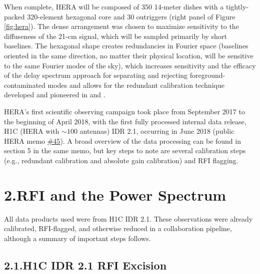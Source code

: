 \documentclass[12pt]{article}
\begin{document}
When complete, HERA will be composed of 350 14-meter dishes with a tightly-packed 320-element hexagonal core and 30 outriggers (right panel of Figure \ref{fig:hera}). The dense arrangement was chosen to maximize sensitivity to the diffuseness of the 21-cm signal, which will be sampled primarily by short baselines. The hexagonal shape creates redundancies in Fourier space (baselines oriented in the same direction, no matter their physical location, will be sensitive to the same Fourier modes of the sky), which increases sensitivity and the efficacy of the delay spectrum approach for separating and rejecting foreground-contaminated modes and allows for the redundant calibration technique developed and pioneered in \cite{liu2010} and \cite{zheng2014}.

HERA's first scientific observing campaign took place from September 2017 to the beginning of April 2018, with the first fully processed internal data release, H1C (HERA with $\sim 100$ antennas) IDR 2.1, occurring in June 2018 (public HERA memo \href{http://reionization.org/wp-content/uploads/2018/07/IDR2.1_Memo_v2.html}{\#45}). A broad overview of the data processing can be found in section 5 in the same memo, but key steps to note are several calibration steps (e.g., redundant calibration and absolute gain calibration) and RFI flagging. \vspace{3mm}

\tocless\section{\hypertarget{sec:rfipspec}{2.\hspace{0.75em}RFI and the Power Spectrum}}

All data products used were from H1C IDR 2.1. These observations were already calibrated, RFI-flagged, and otherwise reduced in a collaboration pipeline, although a summary of important steps follows. \vspace{3mm}

\tocless\subsection{\hypertarget{subsec:h1crfi}{2.1.\hspace{0.75em}H1C IDR 2.1 RFI Excision}}
\end{document}
